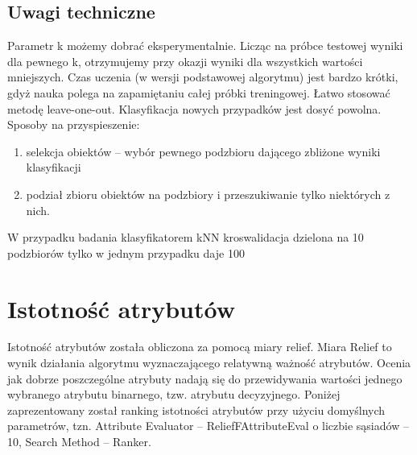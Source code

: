 \documentclass{classrep}
\begin{document}
\subsection{Uwagi techniczne}
Parametr k możemy dobrać eksperymentalnie. Licząc na próbce testowej wyniki dla pewnego k, otrzymujemy przy okazji wyniki dla wszystkich wartości mniejszych.
Czas uczenia (w wersji podstawowej algorytmu) jest bardzo krótki, gdyż nauka polega na zapamiętaniu całej próbki treningowej. Łatwo stosować metodę leave-one-out.
Klasyfikacja nowych przypadków jest dosyć powolna. Sposoby na przyspieszenie:
\begin{enumerate}
\item selekcja obiektów – wybór pewnego podzbioru dającego zbliżone wyniki klasyfikacji
\item podział zbioru obiektów na podzbiory i przeszukiwanie tylko niektórych z nich.
\end{enumerate}

W przypadku badania klasyfikatorem kNN kroswalidacja dzielona na 10 podzbiorów tylko w jednym przypadku daje 100%

\section{Istotność atrybutów}
Istotność atrybutów została obliczona za pomocą miary relief. Miara Relief to wynik działania algorytmu wyznaczającego relatywną ważność atrybutów. Ocenia jak dobrze poszczególne atrybuty nadają się do przewidywania wartości jednego wybranego atrybutu binarnego, tzw. atrybutu decyzyjnego. Poniżej zaprezentowany został ranking istotności atrybutów przy użyciu domyślnych parametrów, tzn. Attribute Evaluator – ReliefFAttributeEval o liczbie sąsiadów – 10, Search Method – Ranker. 
\end{document}

